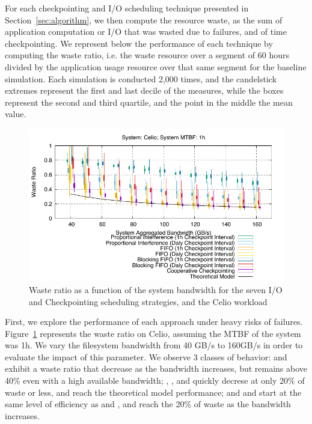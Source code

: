 For each checkpointing and I/O scheduling technique presented in
Section~\ref{sec:algorithm}, we then compute the resource waste, as
the sum of application computation or I/O that was wasted due to
failures, and of time checkpointing. We represent below the
performance of each technique by computing the waste ratio, i.e. the
waste resource over a segment of 60 hours divided by the application
usage resource over that same segment for the baseline
simulation. Each simulation is conducted 2,000 times, and the
candelstick extremes represent the first and last decile of the
measures, while the boxes represent the second and third quartile, and
the point in the middle the mean value.

\begin{figure}
  \begin{center}
    \includegraphics[width=\linewidth]{sim/figures/synthetic-01hMTBF-waste-celio.pdf}
  \end{center}
  \caption{Waste ratio as a function of the system bandwidth for the
    seven I/O and Checkpointing scheduling strategies, and the Celio
    workload \label{fig:celio-1hmtbf}}
\end{figure}

First, we explore the performance of each approach under heavy risks
of failures. Figure~\ref{fig:celio-1hmtbf} represents the waste ratio
on Celio, assuming the MTBF of the system was 1h. We vary the
filesystem bandwidth from 40 GB/s to 160GB/s in order to evaluate the
impact of this parameter. We observe 3 classes of behavior: \propfixed
and \bfifofixed exhibit a waste ratio that decrease as the bandwidth
increases, but remains above 40\% even with a high available
bandwidth; \fifodaly, \fifofixed, and \cooperative quickly decrese at
only 20\% of waste or less, and reach the theoretical model
performance; and \propdaly and \bfifodaly start at the same level of
efficiency as \propfixed and \bfifofixed, and reach the 20\% of waste
as the bandwidth increases.

